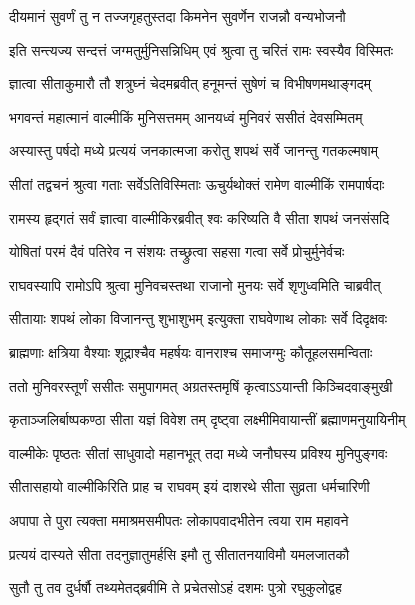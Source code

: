 \twolineshloka
{दीयमानं सुवर्णं तु न तज्जगृहतुस्तदा}
{किमनेन सुवर्णेन राजन्नौ वन्यभोजनौ} %

\twolineshloka
{इति सन्त्यज्य सन्दत्तं जग्मतुर्मुनिसन्निधिम्}
{एवं श्रुत्वा तु चरितं रामः स्वस्यैव विस्मितः} %

\twolineshloka
{ज्ञात्वा सीताकुमारौ तौ शत्रुघ्नं चेदमब्रवीत्}
{हनूमन्तं सुषेणं च विभीषणमथाङ्गदम्} %

\twolineshloka
{भगवन्तं महात्मानं वाल्मीकिं मुनिसत्तमम्}
{आनयध्वं मुनिवरं ससीतं देवसम्मितम्} %

\twolineshloka
{अस्यास्तु पर्षदो मध्ये प्रत्ययं जनकात्मजा}
{करोतु शपथं सर्वे जानन्तु गतकल्मषाम्} %

\twolineshloka
{सीतां तद्वचनं श्रुत्वा गताः सर्वेऽतिविस्मिताः}
{ऊचुर्यथोक्तं रामेण वाल्मीकिं रामपार्षदाः} %

\twolineshloka
{रामस्य हृद्गतं सर्वं ज्ञात्वा वाल्मीकिरब्रवीत्}
{श्वः करिष्यति वै सीता शपथं जनसंसदि} %

\twolineshloka
{योषितां परमं दैवं पतिरेव न संशयः}
{तच्छ्रुत्वा सहसा गत्वा सर्वे प्रोचुर्मुनेर्वचः} %

\twolineshloka
{राघवस्यापि रामोऽपि श्रुत्वा मुनिवचस्तथा}
{राजानो मुनयः सर्वे शृणुध्वमिति चाब्रवीत्} %

\twolineshloka
{सीतायाः शपथं लोका विजानन्तु शुभाशुभम्}
{इत्युक्ता राघवेणाथ लोकाः सर्वे दिदृक्षवः} %

\twolineshloka
{ब्राह्मणाः क्षत्रिया वैश्याः शूद्राश्चैव महर्षयः}
{वानराश्च समाजग्मुः कौतूहलसमन्विताः} %

\twolineshloka
{ततो मुनिवरस्तूर्णं ससीतः समुपागमत्}
{अग्रतस्तमृषिं कृत्वाऽऽयान्ती किञ्चिदवाङ्मुखी} %

\twolineshloka
{कृताञ्जलिर्बाष्पकण्ठा सीता यज्ञं विवेश तम्}
{दृष्ट्वा लक्ष्मीमिवायान्तीं ब्रह्माणमनुयायिनीम्} %

\twolineshloka
{वाल्मीकेः पृष्ठतः सीतां साधुवादो महानभूत्}
{तदा मध्ये जनौघस्य प्रविश्य मुनिपुङ्गवः} %

\twolineshloka
{सीतासहायो वाल्मीकिरिति प्राह च राघवम्}
{इयं दाशरथे सीता सुव्रता धर्मचारिणी} %

\twolineshloka
{अपापा ते पुरा त्यक्ता ममाश्रमसमीपतः}
{लोकापवादभीतेन त्वया राम महावने} %

\twolineshloka
{प्रत्ययं दास्यते सीता तदनुज्ञातुमर्हसि}
{इमौ तु सीतातनयाविमौ यमलजातकौ} %

\twolineshloka
{सुतौ तु तव दुर्धर्षौ तथ्यमेतद्ब्रवीमि ते}
{प्रचेतसोऽहं दशमः पुत्रो रघुकुलोद्वह} %

